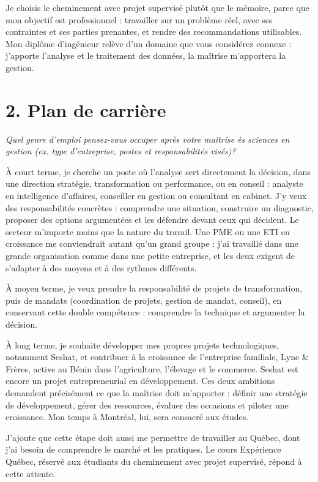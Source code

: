 \documentclass[12pt,a4paper]{article}
\begin{document}
Je choisis le cheminement avec projet supervisé plutôt que le mémoire, parce que mon objectif est professionnel : travailler sur un problème réel, avec ses contraintes et ses parties prenantes, et rendre des recommandations utilisables. Mon diplôme d'ingénieur relève d'un domaine que vous considérez connexe : j'apporte l'analyse et le traitement des données, la maîtrise m'apportera la gestion.

\newpage
\section{2. Plan de carrière}
{\sloppy\itshape\footnotesize Quel genre d'emploi pensez-vous occuper après votre maîtrise ès sciences en gestion (ex. type d'entreprise, postes et responsabilités visés)?\par}
\vspace{0.35em}

À court terme, je cherche un poste où l'analyse sert directement la décision, dans une direction stratégie, transformation ou performance, ou en conseil : analyste en intelligence d'affaires, conseiller en gestion ou consultant en cabinet. J'y veux des responsabilités concrètes : comprendre une situation, construire un diagnostic, proposer des options argumentées et les défendre devant ceux qui décident. Le secteur m'importe moins que la nature du travail. Une PME ou une ETI en croissance me conviendrait autant qu'un grand groupe : j'ai travaillé dans une grande organisation comme dans une petite entreprise, et les deux exigent de s'adapter à des moyens et à des rythmes différents.

À moyen terme, je veux prendre la responsabilité de projets de transformation, puis de mandats (coordination de projets, gestion de mandat, conseil), en conservant cette double compétence : comprendre la technique et argumenter la décision.

À long terme, je souhaite développer mes propres projets technologiques, notamment Seshat, et contribuer à la croissance de l'entreprise familiale, Lyne \& Frères, active au Bénin dans l'agriculture, l'élevage et le commerce. Seshat est encore un projet entrepreneurial en développement. Ces deux ambitions demandent précisément ce que la maîtrise doit m'apporter : définir une stratégie de développement, gérer des ressources, évaluer des occasions et piloter une croissance. Mon temps à Montréal, lui, sera consacré aux études.

J'ajoute que cette étape doit aussi me permettre de travailler au Québec, dont j'ai besoin de comprendre le marché et les pratiques. Le cours Expérience Québec, réservé aux étudiants du cheminement avec projet supervisé, répond à cette attente.
\end{document}
